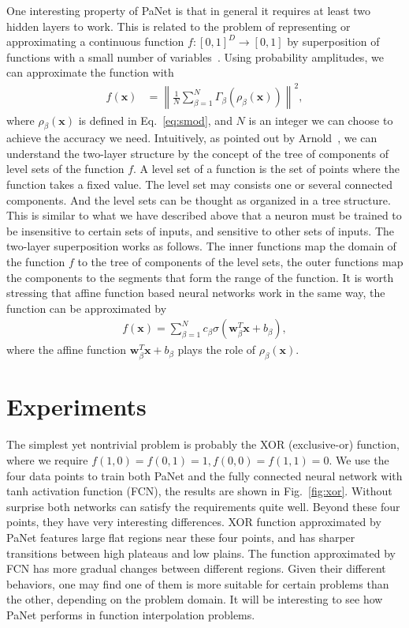 \documentclass{article}
\begin{document}
One interesting property of PaNet is that in general it requires at least
two hidden layers to work. This is related to the problem of representing or
approximating a continuous function \(f: [0,1]^{D} \to [0,1]\) by
superposition of functions with a small number of
variables~\cite{kolmogorov,arnold, hecht-nielsen}. Using probability
amplitudes, we can approximate the function with
\begin{align}
  \label{eq:two-layers}
  f(\mathbf{x}) &= \left\|\frac{1}{N}\sum_{\beta = 1}^{N}\Gamma_{\beta}
                  \left(\rho_{\beta}(\mathbf{x})\right)\right\|^{2},
\end{align}
where \(\rho_{\beta}(\mathbf{x})\) is defined in Eq.~\ref{eq:smod}, and
\(N\) is an integer we can choose to achieve the accuracy we
need. Intuitively, as pointed out by Arnold~\cite{arnold}, we can understand
the two-layer structure by the concept of the tree of components of level
sets of the function \(f\). A level set of a function is the set of points where
the function takes a fixed value. The level set may consists one or several
connected components. And the level sets can be thought as organized in a
tree structure. This is similar to what we have described above that a
neuron must be trained to be insensitive to certain sets of inputs, and
sensitive to other sets of inputs. The two-layer superposition works as
follows. The inner functions map the domain of the function \(f\) to the
tree of components of the level sets, the outer functions map the components
to the segments that form the range of the function. It is worth stressing
that affine function based neural networks work in the same way, the function
can be approximated by~\cite{cybenko}
\begin{align}
  f(\mathbf{x}) = \sum_{\beta=1}^{N}c_{\beta}\sigma\left(\mathbf{w}^{T}_{\beta}\mathbf{x} + b_{\beta}\right),
\end{align}
where the affine function
\(\mathbf{w}_{\beta}^{T}\mathbf{x} + b_{\beta}\) plays the role of
\(\rho_{\beta}(\mathbf{x})\).

\section{Experiments}

The simplest yet nontrivial problem is probably the XOR (exclusive-or)
function, where we require \(f(1,0) = f(0,1) = 1, f(0,0) = f(1,1) = 0\). We
use the four data points to train both PaNet and the fully connected neural
network with tanh activation function (FCN), the results are shown in
Fig.~\ref{fig:xor}. Without surprise both networks can satisfy the
requirements quite well. Beyond these four points, they have very
interesting differences. XOR function approximated by PaNet features large
flat regions near these four points, and has sharper transitions between
high plateaus and low plains. The function approximated by FCN has more
gradual changes between different regions. Given their different behaviors,
one may find one of them is more suitable for certain problems than the
other, depending on the problem domain. It will be interesting to see
how PaNet performs in function interpolation problems.
\end{document}
